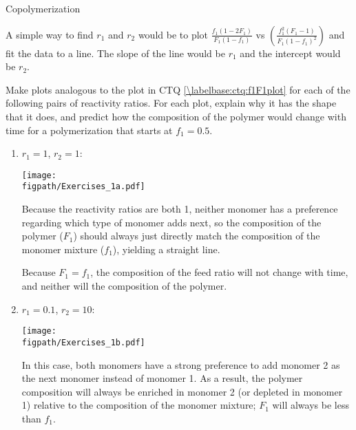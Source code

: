 \begin{activity}{Copolymerization}
\begin{ctqs}
\begin{enumerate}
				\begin{solution}[2in]{}
					A simple way to find $r_1$ and $r_2$ would be to plot $\frac{f_1(1-2F_1)}{F_1(1-f_1)}$ vs  $\left(\frac{f_1^2(F_1-1)}{F_1(1-f_1)^2}\right)$ and fit the data to a line.  The slope of the line would be $r_1$ and the intercept would be $r_2$.
				\end{solution}
		\end{enumerate}
\end{ctqs}


\begin{exercises}

	\exercise Make plots analogous to the plot in CTQ \ref{\labelbase:ctq:f1F1plot} for each of the following pairs of reactivity ratios.  For each plot, explain why it has the shape that it does, and predict how the composition of the polymer would change with time for a polymerization that starts at $f_1=0.5$.
	
		\begin{enumerate}
			\item $r_1=1$, $r_2=1$:
	
				\begin{solution}{}
					\centerline{\texttt{[image: \\figpath/Exercises\_1a.pdf]}}
				
					Because the reactivity ratios are both 1, neither monomer has a preference regarding which type of monomer adds next, so the composition of the polymer ($F_1$) should always just directly match the composition of the monomer mixture ($f_1$), yielding a straight line.
					
					Because $F_1=f_1$, the composition of the feed ratio will not change with time, and neither will the composition of the polymer.
		
				\end{solution}		

			\item $r_1=0.1$, $r_2=10$:
			
				\begin{solution}{}
	
					\centerline{\texttt{[image: \\figpath/Exercises\_1b.pdf]}}
				
					In this case, both monomers have a strong preference to add monomer 2 as the next monomer instead of monomer 1.  As a result, the polymer composition will always be enriched in monomer 2 (or depleted in monomer 1) relative to the composition of the monomer mixture; $F_1$ will always be less than $f_1$.
					

\end{solution}
\end{enumerate}
\end{exercises}
\end{activity}
